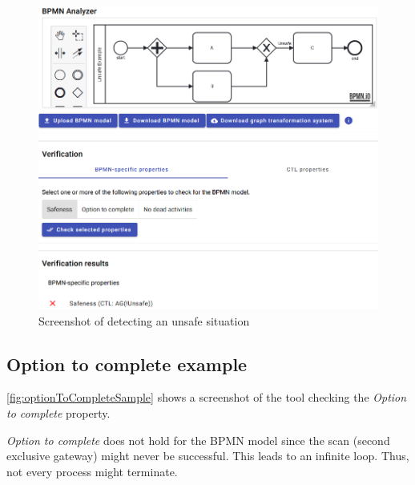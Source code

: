 \documentclass[runningheads]{llncs}
\begin{document}
\begin{figure}[ht]
    \centering
    \includegraphics[width=1\textwidth]{artifacts/appendix/unsafe_sample.png}
    \caption{Screenshot of detecting an unsafe situation}
    \label{fig:unsafeSample}
\end{figure}

\subsection{Option to complete example}
\autoref{fig:optionToCompleteSample} shows a screenshot of the tool checking the \textit{Option to complete} property.

\textit{Option to complete} does not hold for the BPMN model since the scan (second exclusive gateway) might never be successful.
This leads to an infinite loop.
Thus, not every process might terminate.
\end{document}
